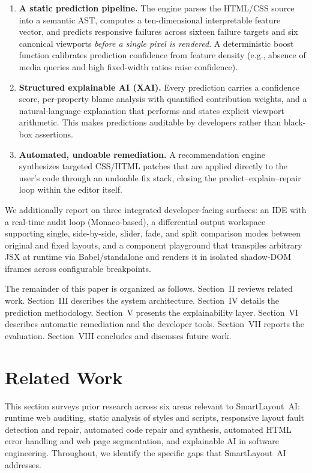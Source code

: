 \documentclass[conference]{IEEEtran}
\begin{document}
\begin{enumerate}
  \item \textbf{A static prediction pipeline.} The engine parses the
  HTML/CSS source into a semantic AST, computes a ten-dimensional
  interpretable feature vector, and predicts responsive failures across
  sixteen failure targets and six canonical viewports \textit{before a
  single pixel is rendered}. A deterministic boost function calibrates
  prediction confidence from feature density (e.g., absence of media
  queries and high fixed-width ratios raise confidence).

  \item \textbf{Structured explainable AI (XAI).} Every prediction
  carries a confidence score, per-property blame analysis with quantified
  contribution weights, and a natural-language explanation that performs
  and states explicit viewport arithmetic. This makes predictions
  auditable by developers rather than black-box assertions.

  \item \textbf{Automated, undoable remediation.} A recommendation
  engine synthesizes targeted CSS/HTML patches that are applied directly
  to the user's code through an undoable fix stack, closing the
  predict--explain--repair loop within the editor itself.
\end{enumerate}

We additionally report on three integrated developer-facing surfaces: an
IDE with a real-time audit loop (Monaco-based), a differential output
workspace supporting single, side-by-side, slider, fade, and split
comparison modes between original and fixed layouts, and a component
playground that transpiles arbitrary JSX at runtime via
Babel/standalone and renders it in isolated shadow-DOM iframes across
configurable breakpoints.

The remainder of this paper is organized as follows. Section~II reviews
related work. Section~III describes the system architecture. Section~IV
details the prediction methodology. Section~V presents the explainability
layer. Section~VI describes automatic remediation and the developer
tools. Section~VII reports the evaluation. Section~VIII concludes and
discusses future work.

\section{Related Work}

This section surveys prior research across six areas relevant to
SmartLayout~AI: runtime web auditing, static analysis of styles and
scripts, responsive layout fault detection and repair, automated code
repair and synthesis, automated HTML error handling and web page
segmentation, and explainable AI in software engineering. Throughout,
we identify the specific gaps that SmartLayout~AI addresses.
\end{document}
